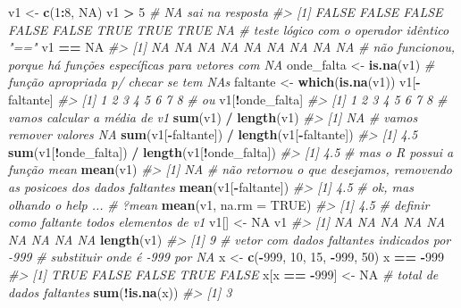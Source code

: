 \documentclass[]{book}
\newenvironment{Shaded}{\begin{snugshade}}{\end{snugshade}}
\newcommand{\KeywordTok}[1]{\textcolor[rgb]{0.13,0.29,0.53}{\textbf{#1}}}
\newcommand{\DataTypeTok}[1]{\textcolor[rgb]{0.13,0.29,0.53}{#1}}
\newcommand{\DecValTok}[1]{\textcolor[rgb]{0.00,0.00,0.81}{#1}}
\newcommand{\StringTok}[1]{\textcolor[rgb]{0.31,0.60,0.02}{#1}}
\newcommand{\CommentTok}[1]{\textcolor[rgb]{0.56,0.35,0.01}{\textit{#1}}}
\newcommand{\OtherTok}[1]{\textcolor[rgb]{0.56,0.35,0.01}{#1}}
\newcommand{\OperatorTok}[1]{\textcolor[rgb]{0.81,0.36,0.00}{\textbf{#1}}}
\newcommand{\NormalTok}[1]{#1}
\begin{document}
\begin{Shaded}
\begin{Highlighting}[]
\NormalTok{v1 <-}\StringTok{ }\KeywordTok{c}\NormalTok{(}\DecValTok{1}\OperatorTok{:}\DecValTok{8}\NormalTok{, }\OtherTok{NA}\NormalTok{)}
\NormalTok{v1 }\OperatorTok{>}\StringTok{ }\DecValTok{5} \CommentTok{# NA sai na resposta}
\CommentTok{#> [1] FALSE FALSE FALSE FALSE FALSE  TRUE  TRUE  TRUE    NA}
\CommentTok{# teste lógico com o operador idêntico "=="}
\NormalTok{v1 }\OperatorTok{==}\StringTok{ }\OtherTok{NA}
\CommentTok{#> [1] NA NA NA NA NA NA NA NA NA}
\CommentTok{# não funcionou, porque há funções específicas para vetores com NA}
\NormalTok{onde_falta <-}\StringTok{ }\KeywordTok{is.na}\NormalTok{(v1)}
\CommentTok{# função apropriada p/ checar se tem NAs}
\NormalTok{faltante <-}\StringTok{ }\KeywordTok{which}\NormalTok{(}\KeywordTok{is.na}\NormalTok{(v1))}
\NormalTok{v1[}\OperatorTok{-}\NormalTok{faltante]}
\CommentTok{#> [1] 1 2 3 4 5 6 7 8}
\CommentTok{# ou}
\NormalTok{v1[}\OperatorTok{!}\NormalTok{onde_falta]}
\CommentTok{#> [1] 1 2 3 4 5 6 7 8}
\CommentTok{# vamos calcular a média de v1}
\KeywordTok{sum}\NormalTok{(v1) }\OperatorTok{/}\StringTok{ }\KeywordTok{length}\NormalTok{(v1)}
\CommentTok{#> [1] NA}
\CommentTok{# vamos remover valores NA}
\KeywordTok{sum}\NormalTok{(v1[}\OperatorTok{-}\NormalTok{faltante]) }\OperatorTok{/}\StringTok{ }\KeywordTok{length}\NormalTok{(v1[}\OperatorTok{-}\NormalTok{faltante])}
\CommentTok{#> [1] 4.5}
\KeywordTok{sum}\NormalTok{(v1[}\OperatorTok{!}\NormalTok{onde_falta]) }\OperatorTok{/}\StringTok{ }\KeywordTok{length}\NormalTok{(v1[}\OperatorTok{!}\NormalTok{onde_falta])}
\CommentTok{#> [1] 4.5}
\CommentTok{# mas o R possui a função mean}
\KeywordTok{mean}\NormalTok{(v1)}
\CommentTok{#> [1] NA}
\CommentTok{# não retornou o que desejamos, removendo as posicoes dos dados faltantes}
\KeywordTok{mean}\NormalTok{(v1[}\OperatorTok{-}\NormalTok{faltante])}
\CommentTok{#> [1] 4.5}
\CommentTok{# ok, mas olhando o help ...}
\CommentTok{# ?mean}
\KeywordTok{mean}\NormalTok{(v1, }\DataTypeTok{na.rm =} \OtherTok{TRUE}\NormalTok{)}
\CommentTok{#> [1] 4.5}
\CommentTok{# definir como faltante todos elementos de v1}
\NormalTok{v1[] <-}\StringTok{ }\OtherTok{NA}
\NormalTok{v1}
\CommentTok{#> [1] NA NA NA NA NA NA NA NA NA}
\KeywordTok{length}\NormalTok{(v1)}
\CommentTok{#> [1] 9}
\CommentTok{# vetor com dados faltantes indicados por -999}
\CommentTok{# substituir onde é -999 por NA}
\NormalTok{x <-}\StringTok{ }\KeywordTok{c}\NormalTok{(}\OperatorTok{-}\DecValTok{999}\NormalTok{, }\DecValTok{10}\NormalTok{, }\DecValTok{15}\NormalTok{, }\OperatorTok{-}\DecValTok{999}\NormalTok{, }\DecValTok{50}\NormalTok{)}
\NormalTok{x }\OperatorTok{==}\StringTok{ }\OperatorTok{-}\DecValTok{999}
\CommentTok{#> [1]  TRUE FALSE FALSE  TRUE FALSE}
\NormalTok{x[x }\OperatorTok{==}\StringTok{ }\OperatorTok{-}\DecValTok{999}\NormalTok{] <-}\StringTok{ }\OtherTok{NA}
\CommentTok{# total de dados faltantes}
\KeywordTok{sum}\NormalTok{(}\OperatorTok{!}\KeywordTok{is.na}\NormalTok{(x))}
\CommentTok{#> [1] 3}
\end{Highlighting}
\end{Shaded}
\end{document}
